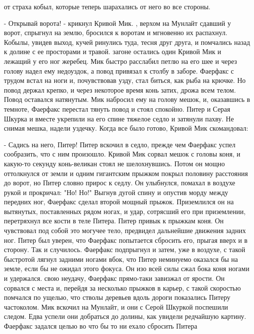 от страха кобыл, которые теперь шарахались от него во все стороны.
\par- Открывай ворота! - крикнул Кривой Мик.
, верхом на Мунлайт сдавший у ворот, спрыгнул на землю, 
бросился к воротам и мгновенно их распахнул. Кобылы, увидев выход, 
кучей ринулись туда, тесня друг друга, и помчались назад к долине с ее 
просторами и травой.
 загоне остались один Кривой Мик и лежащий у его ног жеребец. Мик 
быстро расслабил петлю на его шее и через голову надел ему недоуздок, 
а повод привязал к столбу в заборе. Фаерфакс с трудом встал на ноги и, 
почувствовав узду, стал биться, как рыба на крючке. Но повод держал 
крепко, и через некоторое время конь затих, дрожа всем телом. Повод 
оставался натянутым.
 Мик набросил ему на голову мешок, и, оказавшись в темноте, 
Фаерфакс перестал тянуть повод и стоял спокойно.
 Питер и Серая Шкурка и вместе укрепили на его спине 
тяжелое седло и затянули пахву. Не снимая мешка, надели уздечку. Когда 
все было готово, Кривой Мик скомандовал:
\par- Садись на него, Питер!
 Питер вскочил в седло, прежде чем Фаерфакс успел сообразить, что 
с ним произошло.
 Кривой Мик сорвал мешок с головы коня, и какую-то секунду 
конь-великан стоял не шелохнувшись. Потом он мощно оттолкнулся от 
земли и одним гигантским прыжком покрыл половину расстояния до ворот, 
но Питер словно прирос к седлу. Он улыбнулся, помахал в воздухе рукой 
и прокричал: "Но! Но!" Выгнув дугой спину и опустив морду между 
передних ног, Фаерфакс сделал второй мощный прыжок. Приземлился он на 
вытянутых, поставленных рядом ногах, и удар, сотрясший его при 
приземлении, перетряхнул все кости в теле Питера.
 Питер привык к прыжкам коня. Он чувствовал под собой это 
могучее тело, предвидел дальнейшие движения задних ног. Питер был 
уверен, что Фаерфакс попытается сбросить его, прыгая вверх и в 
сторону. Так и случилось. Фаерфакс подпрыгнул и затем, уже в воздухе, 
с такой быстротой лягнул задними ногами вбок, что Питер неминуемо 
оказался бы на земле, если бы не ожидал этого фокуса. Он изо всей силы 
сжал бока коня ногами и удержался.
 свою неудачу, Фаерфакс прямо-таки завизжал от ярости. Он 
сорвался с места и, перейдя за несколько прыжков в карьер, с такой 
скоростью помчался по ущелью, что стволы деревьев вдоль дороги 
показались Питеру частоколом.
 Мик вскочил на Мунлайт, и они с Серой Шкуркой поспешили 
следом. Едва успели они добраться до долины, как увидели редчайшую 
картину. Фаерфакс задался целью во что бы то ни ехало сбросить Питера 
